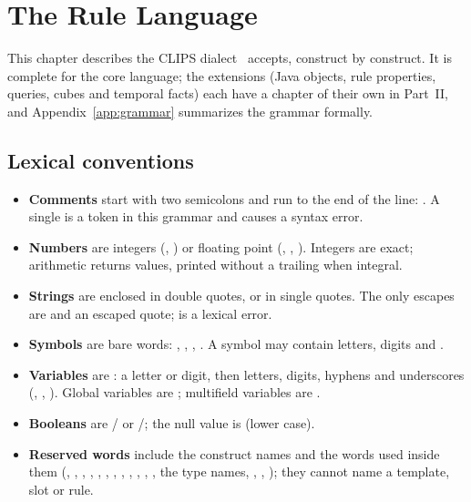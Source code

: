 \chapter{The Rule Language}
\label{ch:language}

This chapter describes the CLIPS dialect \Morendo\ accepts, construct by
construct. It is complete for the core language; the extensions (Java
objects, rule properties, queries, cubes and temporal facts) each have a
chapter of their own in Part~II, and Appendix~\ref{app:grammar}
summarizes the grammar formally.

\section{Lexical conventions}

\begin{itemize}
\item \textbf{Comments} start with two semicolons and run to the end of the
  line: . A single \fn{;} is a token in this grammar and
  causes a syntax error.
\item \textbf{Numbers} are integers (, ) or floating point
  (, , ). Integers are exact; arithmetic returns
   values, printed without a trailing  when integral.
\item \textbf{Strings} are enclosed in double quotes, or in single quotes.
  The only escapes are \fn{\textbackslash\textbackslash} and an escaped
  quote;  is a lexical error.
\item \textbf{Symbols} are bare words: , ,
  , . A symbol may contain letters,
  digits and .
\item \textbf{Variables} are : a letter or digit, then letters,
  digits, hyphens and underscores (, ,
  ). Global variables are ; multifield
  variables are .
\item \textbf{Booleans} are / or /;
  the null value is  (lower case).
\item \textbf{Reserved words} include the construct names and the words
  used inside them (, , , ,
  , , , , ,
  , , , the type names, ,
  , ); they cannot name a template, slot or rule.
\end{itemize}

